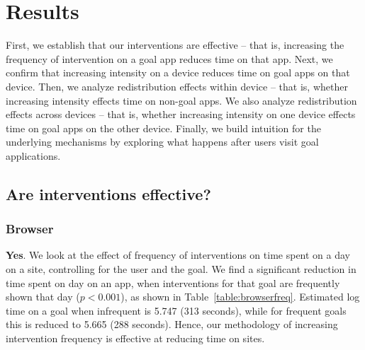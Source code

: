 \section{Results}



First, we establish that our interventions are effective -- that is, increasing the frequency of intervention on a goal app reduces time on that app. Next, we confirm that increasing intensity on a device reduces time on goal apps on that device. Then, we analyze redistribution effects within device -- that is, whether increasing intensity effects time on non-goal apps. We also analyze redistribution effects across devices -- that is, whether increasing intensity on one device effects time on goal apps on the other device. Finally, we build intuition for the underlying mechanisms by exploring what happens after users visit goal applications.

\subsection{Are interventions effective?}

\subsubsection{Browser}
\textbf{Yes}. We look at the effect of frequency of interventions on time spent on a day on a site, controlling for the user and the goal. We find a significant reduction in time spent on day on an app, when interventions for that goal are frequently shown that day ($p < 0.001$), as shown in Table~\ref{table:browserfreq}. Estimated log time on a goal when infrequent is 5.747 (313 seconds), while for frequent goals this is reduced to 5.665 (288 seconds). Hence, our methodology of increasing intervention frequency is effective at reducing time on sites. %



